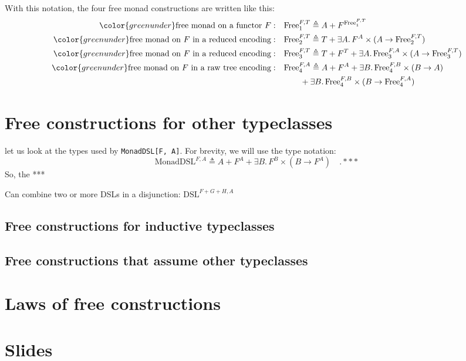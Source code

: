 With this notation, the four free monad constructions are written
like this:
\begin{align*}
{\color{greenunder}\text{free monad on a functor }F:}\quad & \text{Free}_{1}^{F,T}\triangleq A+F^{\text{Free}_{1}^{F,T}}\\
{\color{greenunder}\text{free monad on }F\text{ in a reduced encoding}:}\quad & \text{Free}_{2}^{F,T}\triangleq T+\exists A.\,F^{A}\times(A\rightarrow\text{Free}_{2}^{F,T})\\
{\color{greenunder}\text{free monad on }F\text{ in a reduced encoding}:}\quad & \text{Free}_{3}^{F,T}\triangleq T+F^{T}+\exists A.\,\text{Free}_{3}^{F,A}\times(A\rightarrow\text{Free}_{3}^{F,T})\\
{\color{greenunder}\text{free monad on }F\text{ in a raw tree encoding}:}\quad & \text{Free}_{4}^{F,A}\triangleq A+F^{A}+\exists B.\,\text{Free}_{4}^{F,B}\times(B\rightarrow A)\\
 & \quad\quad+\exists B.\,\text{Free}_{4}^{F,B}\times(B\rightarrow\text{Free}_{4}^{F,A})
\end{align*}


\section{Free constructions for other typeclasses}

let us look at the types used by \lstinline!MonadDSL[F, A]!.
For brevity, we will use the type notation:
\[
\text{MonadDSL}^{F,A}\triangleq A+F^{A}+\exists B.\,F^{B}\times(B\rightarrow F^{A})\quad.***
\]
 So, the {*}{*}{*}

Can combine two or more DSLs in a disjunction: $\text{DSL}^{F+G+H,A}$

\subsection{Free constructions for inductive typeclasses}

\subsection{Free constructions that assume other typeclasses}

\section{Laws of free constructions}

\section{Slides}

